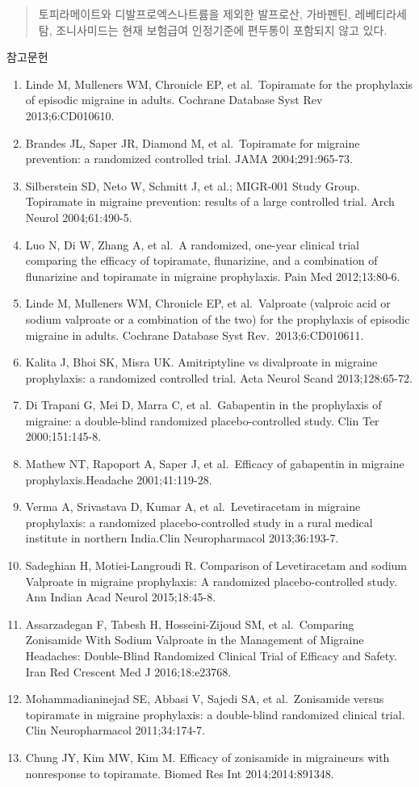 \documentclass[]{book}
\begin{document}
\begin{quote}
토피라메이트와 디발프로엑스나트륨을 제외한 발프로산, 가바펜틴, 레베티라세탐, 조니사미드는 현재 보험급여 인정기준에 편두통이 포함되지 않고 있다.
\end{quote}

참고문헌

\begin{enumerate}
\def\labelenumi{\arabic{enumi}.}
\item
  Linde M, Mulleners WM, Chronicle EP, et al.~Topiramate for the prophylaxis of episodic migraine in adults. Cochrane Database Syst Rev 2013;6:CD010610.
\item
  Brandes JL, Saper JR, Diamond M, et al.~Topiramate for migraine prevention: a randomized controlled trial. JAMA 2004;291:965-73.
\item
  Silberstein SD, Neto W, Schmitt J, et al.; MIGR-001 Study Group. Topiramate in migraine prevention: results of a large controlled trial. Arch Neurol 2004;61:490-5.
\item
  Luo N, Di W, Zhang A, et al.~A randomized, one-year clinical trial comparing the efficacy of topiramate, flunarizine, and a combination of flunarizine and topiramate in migraine prophylaxis. Pain Med 2012;13:80-6.
\item
  Linde M, Mulleners WM, Chronicle EP, et al.~Valproate (valproic acid or sodium valproate or a combination of the two) for the prophylaxis of episodic migraine in adults. Cochrane Database Syst Rev.~2013;6:CD010611.
\item
  Kalita J, Bhoi SK, Misra UK. Amitriptyline vs divalproate in migraine prophylaxis: a randomized controlled trial. Acta Neurol Scand 2013;128:65-72.
\item
  Di Trapani G, Mei D, Marra C, et al.~Gabapentin in the prophylaxis of migraine: a double-blind randomized placebo-controlled study. Clin Ter 2000;151:145-8.
\item
  Mathew NT, Rapoport A, Saper J, et al.~Efficacy of gabapentin in migraine prophylaxis.Headache 2001;41:119-28.
\item
  Verma A, Srivastava D, Kumar A, et al.~Levetiracetam in migraine prophylaxis: a randomized placebo-controlled study in a rural medical institute in northern India.Clin Neuropharmacol 2013;36:193-7.
\item
  Sadeghian H, Motiei-Langroudi R. Comparison of Levetiracetam and sodium Valproate in migraine prophylaxis: A randomized placebo-controlled study. Ann Indian Acad Neurol 2015;18:45-8.
\item
  Assarzadegan F, Tabesh H, Hosseini-Zijoud SM, et al.~Comparing Zonisamide With Sodium Valproate in the Management of Migraine Headaches: Double-Blind Randomized Clinical Trial of Efficacy and Safety. Iran Red Crescent Med J 2016;18:e23768.
\item
  Mohammadianinejad SE, Abbasi V, Sajedi SA, et al.~Zonisamide versus topiramate in migraine prophylaxis: a double-blind randomized clinical trial. Clin Neuropharmacol 2011;34:174-7.
\item
  Chung JY, Kim MW, Kim M. Efficacy of zonisamide in migraineurs with nonresponse to topiramate. Biomed Res Int 2014;2014:891348.
\end{enumerate}
\end{document}
